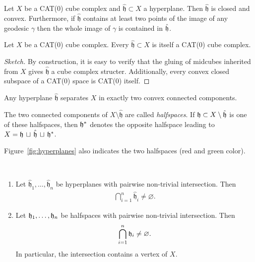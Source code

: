 \begin{prop}
  Let \(X\) be a CAT(0) cube complex and \(\mathfrak{\hat h} \subset X\) a hyperplane. Then \(\mathfrak{\hat h}\) is closed and convex. Furthermore, if \(\mathfrak{\hat h}\) contains at least two points of the image of any geodesic \(\gamma\) then the whole image of \(\gamma\) is contained in \(\mathfrak{\hat h}\).
\end{prop}

\begin{cor}
  Let \(X\) be a CAT(0) cube complex. Every \(\mathfrak{\hat h} \subset X\) is itself a CAT(0) cube complex.
\end{cor}

\begin{proof}[Sketch]
  By construction, it is easy to verify that the gluing of midcubes inherited from \(X\) gives \(\mathfrak{\hat h}\) a cube complex structer. Additionally, every convex closed subspace of a CAT(0) space is CAT(0) itself.
\end{proof}

\begin{thm}
  Any hyperplane \(\mathfrak{\hat h}\) separates \(X\) in exactly two convex connected components.
\end{thm}

\begin{defin}[Halfspaces]
  The two connected components of \(X \setminus \mathfrak{\hat h}\) are called \emph{halfspaces}. If \(\mathfrak{h} \subset X \setminus \mathfrak{\hat h}\) is one of these halfspaces, then \(\mathfrak{h}^\ast\) denotes the opposite halfspace leading to \(X = \mathfrak{h}\, \sqcup\, \mathfrak{\hat h}\, \sqcup\, \mathfrak{h}^\ast \).
\end{defin}

\begin{bsp}
  Figure~\ref{fig:hyperplanes} also indicates the two halfspaces (red and green color).
\end{bsp}

\begin{thm}~\vspace{-6pt}
  \label{thm:common-intersection}
  \begin{enumerate} 
  \item Let \(\mathfrak{\hat h}_1, \dots, \mathfrak{\hat h}_n\) be hyperplanes with pairwise non-trivial intersection. Then
    \begin{align*}
      \bigcap_{i=1}^n \mathfrak{\hat h}_i \neq \varnothing.
    \end{align*}
  \item Let \(\mathfrak{h}_1, \dots, \mathfrak{h}_n\) be halfspaces with pairwise non-trivial intersection. Then
    \begin{align*}
      \bigcap_{i=1}^n \mathfrak{h}_i \neq \varnothing.
    \end{align*}
    In particular, the intersection contains a vertex of \(X\).
  \end{enumerate}
\end{thm}

